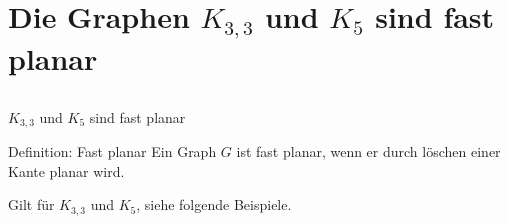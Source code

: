 \documentclass[aspectratio=169]{beamer}
\begin{document}
\section{Die Graphen $K_{3,3}$ und $K_5$ sind fast planar}
\subsection{}

\begin{frame}[c]{$K_{3,3}$ und $K_5$ sind fast planar} \vspace{4pt}

\begin{block}{Definition: Fast planar}
Ein Graph $G$ ist fast planar, wenn er durch löschen einer Kante planar wird.
\end{block}

\vspace{1em}
Gilt für $K_{3,3}$ und $K_5$, siehe folgende Beispiele.

\end{frame}
\end{document}
